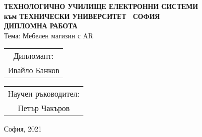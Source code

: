 \begin{center}
    \textbf{\Large ТЕХНОЛОГИЧНО УЧИЛИЩЕ ЕЛЕКТРОННИ СИСТЕМИ\\[0.2cm]}
    \textbf{към ТЕХНИЧЕСКИ УНИВЕРСИТЕТ \textendash\ СОФИЯ\\[6cm]}
    \textbf{\LARGE ДИПЛОМНА РАБОТА\\[4cm]}
    Тема: Мебелен магизин с AR\\[4cm]

    \begin{minipage}[t]{0.4\textwidth}
    \begin{flushleft}
        \begin{tabular}{@{}c@{}}
            \large {Дипломант:}\\
            Ивайло Банков
        \end{tabular}
    \end{flushleft}
    \end{minipage}
    \begin{minipage}[t]{0.4\textwidth}
    \begin{flushright}
        \begin{tabular}{@{}c@{}}
            \large {Научен ръководител:}\\
            Петър Чакъров
        \end{tabular}
    \end{flushright}
    \end{minipage}

    \vfill

    {\large София, 2021}
\end{center}